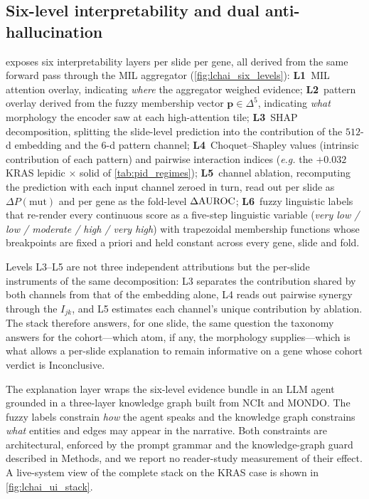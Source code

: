 \subsection*{Six-level interpretability and dual anti-hallucination}

\lchai{} exposes six interpretability layers per slide per gene,
all derived from the same forward pass through the MIL aggregator
(\cref{fig:lchai_six_levels}):
\textbf{L1}~MIL attention overlay, indicating \emph{where} the
aggregator weighed evidence;
\textbf{L2}~pattern overlay derived from the fuzzy
membership vector $\mathbf{p}\in\Delta^5$, indicating
\emph{what} morphology the encoder saw at each high-attention
tile;
\textbf{L3}~SHAP decomposition,\cite{lundberg2017shap}
splitting the slide-level prediction into the contribution of
the $512$-d \ctranspath{} embedding and the $6$-d pattern channel;
\textbf{L4}~Choquet--Shapley values (intrinsic contribution of
each pattern) and pairwise interaction indices (\emph{e.g.} the
$+0.032$ KRAS lepidic$\,\times\,$solid of
\cref{tab:pid_regimes});
\textbf{L5}~channel ablation, recomputing the prediction with each
input channel zeroed in turn, read out per slide as
$\Delta P(\mathrm{mut})$ and per gene as the fold-level
$\Delta\text{AUROC}$;
\textbf{L6}~fuzzy linguistic labels that re-render every continuous
score as a five-step linguistic variable
(\emph{very low / low / moderate / high / very high}) with
trapezoidal membership functions whose breakpoints are fixed a
priori and held constant across every gene, slide and fold.

Levels L3--L5 are not three independent attributions but the
per-slide instruments of the same decomposition: L3 separates the
contribution shared by both channels from that of the embedding
alone, L4 reads out pairwise synergy through the $I_{jk}$, and L5
estimates each channel's unique contribution by ablation.
The stack therefore answers, for one slide, the same question the
taxonomy answers for the cohort---which atom, if any, the
morphology supplies---which is what allows a per-slide explanation
to remain informative on a gene whose cohort verdict is
Inconclusive.

The explanation layer wraps the six-level evidence bundle in an
LLM agent grounded in a three-layer knowledge graph built from
NCIt\cite{sioutos2007ncit} and MONDO.\cite{mondo_shefchek2020}
The fuzzy labels constrain \emph{how} the agent speaks and the
knowledge graph constrains \emph{what} entities and edges may appear in
the narrative.
Both constraints are architectural, enforced by the prompt
grammar and the knowledge-graph guard described in Methods, and we
report no reader-study measurement of their effect.
A live-system view of the complete stack on the KRAS case is shown in
\cref{fig:lchai_ui_stack}.

